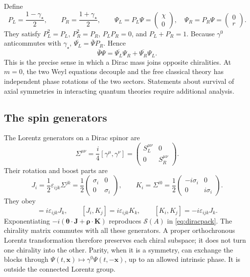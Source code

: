 \documentclass[11pt]{article}
\newcommand{\eps}{\varepsilon}
\begin{document}
Define
\begin{equation}
 P_L=\frac{1-\gamma_\star}{2},\qquad
 P_R=\frac{1+\gamma_\star}{2},\qquad
 \Psi_L=P_L\Psi=\begin{pmatrix}\chi\\0\end{pmatrix},\quad
 \Psi_R=P_R\Psi=\begin{pmatrix}0\\r\end{pmatrix}.
 \label{eq:projectors}
\end{equation}
They satisfy \(P_L^2=P_L\), \(P_R^2=P_R\),
\(P_LP_R=0\), and \(P_L+P_R=1\).
Because \(\gamma^0\) anticommutes with \(\gamma_\star\),
\(\overline{\Psi_L}=\bar\Psi P_R\). Hence
\begin{equation}
 \bar\Psi\Psi=\overline{\Psi_L}\Psi_R+
                  \overline{\Psi_R}\Psi_L.
 \label{eq:chiralmass}
\end{equation}
This is the precise sense in which a Dirac mass joins opposite
chiralities. At \(m=0\), the two Weyl equations decouple and the free
classical theory has independent phase rotations of the two sectors.
Statements about survival of axial symmetries in interacting quantum
theories require additional analysis.

\subsection{The spin generators}
The Lorentz generators on a Dirac spinor are
\begin{equation}
 \Sigma^{\mu\nu}=\frac{i}{4}[\gamma^\mu,\gamma^\nu]
 =\begin{pmatrix}S_L^{\mu\nu}&0\\0&S_R^{\mu\nu}\end{pmatrix}.
 \label{eq:Sigmadef}
\end{equation}
Their rotation and boost parts are
\begin{equation}
 J_i=\frac12\eps_{ijk}\Sigma^{jk}
    =\frac12\begin{pmatrix}\sigma_i&0\\0&\sigma_i\end{pmatrix},
 \qquad
 K_i=\Sigma^{i0}
    =\frac12\begin{pmatrix}-i\sigma_i&0\\0&i\sigma_i\end{pmatrix}.
 \label{eq:JK}
\end{equation}
They obey
\begin{equation}
 [J_i,J_j]=i\eps_{ijk}J_k,\qquad
 [J_i,K_j]=i\eps_{ijk}K_k,\qquad
 [K_i,K_j]=-i\eps_{ijk}J_k.
 \label{eq:lorentzalgebra}
\end{equation}
Exponentiating \(-i(\bm\theta\cdot\bm J+\bm\rho\cdot\bm K)\)
reproduces \(\mathcal S(A)\) in \eqref{eq:diracpack}.
The chirality matrix commutes with all these generators. A proper
orthochronous Lorentz transformation therefore preserves each chiral
subspace; it does not turn one chirality into the other.
Parity, when it is a symmetry, can exchange the blocks through
\(\Psi(t,\bm x)\mapsto\gamma^0\Psi(t,-\bm x)\), up to an
allowed intrinsic phase. It is outside the connected Lorentz group.
\end{document}
